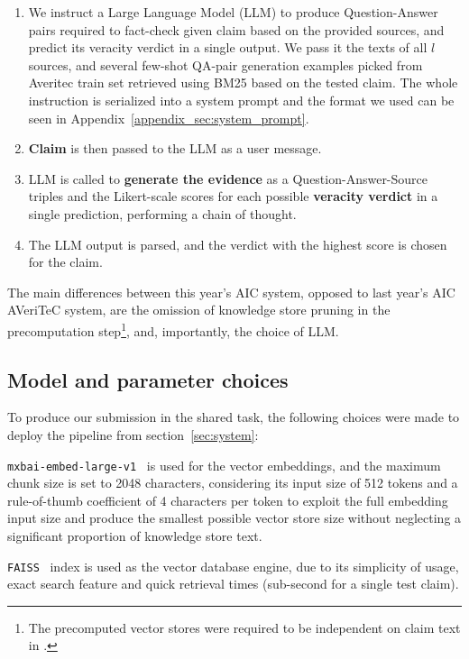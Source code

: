 \begin{enumerate}[label=\roman*.]
\begin{enumerate}[label=\arabic*.]  %
    \item We instruct a Large Language Model (LLM) to produce Question-Answer pairs required to fact-check given claim based on the provided sources, and predict its veracity verdict in a single output. We pass it the texts of all $l$ sources, and several few-shot QA-pair generation examples picked from Averitec train set retrieved using BM25 based on the tested claim. The whole instruction is serialized into a system prompt and the format we used can be seen in Appendix~\ref{appendix_sec:system_prompt}.
    \item \textbf{Claim} is then passed to the LLM as a user message.
    \item LLM is called to \textbf{generate the evidence} as a Question-Answer-Source triples and the Likert-scale scores for each possible \textbf{veracity verdict} in a single prediction, performing a chain of thought. 
    \item The LLM output is parsed, and the verdict with the highest score is chosen for the claim.
\end{enumerate}
\end{enumerate}

The main differences between this year's AIC \averitec{} system, opposed to last year's AIC AVeriTeC system, are the omission of knowledge store pruning in the precomputation step\footnote{The precomputed vector stores were required to be independent on claim text in \averitec{}.}, and, importantly, the choice of LLM.
\subsection{Model and parameter choices}
\label{sec:choices}
To produce our submission in the \averitec{} shared task, the following choices were made to deploy the pipeline from section~\ref{sec:system}:

\texttt{mxbai-embed-large-v1}~\cite{li-li-2024-aoe,emb2024mxbai} is used for the vector embeddings, and the maximum chunk size is set to 2048 characters, considering its input size of 512 tokens and a rule-of-thumb coefficient of 4 characters per token to exploit the full embedding input size and produce the smallest possible vector store size without neglecting a significant proportion of knowledge store text.

\texttt{FAISS}~\cite{douze2024faiss,johnson2019billion} index is used as the vector database engine, due to its simplicity of usage, exact search feature and quick retrieval times (sub-second for a single \averitec{} test claim).


